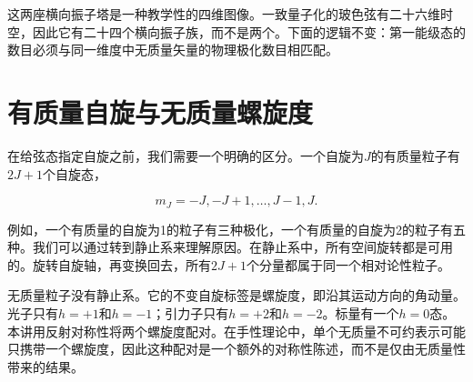 \begin{classroomqa}
\end{classroomqa}

\begin{classroomqa}
\end{classroomqa}

这两座横向振子塔是一种教学性的四维图像。一致量子化的玻色弦有二十六维时空，因此它有二十四个横向振子族，而不是两个。下面的逻辑不变：第一能级态的数目必须与同一维度中无质量矢量的物理极化数目相匹配。

\section{有质量自旋与无质量螺旋度}

在给弦态指定自旋之前，我们需要一个明确的区分。一个自旋为\(J\)的有质量粒子有\(2J+1\)个自旋态，

\begin{equation}
  m_J=-J,-J+1,\ldots,J-1,J.
  \label{eq:l03-massive-spin-multiplet}
\end{equation}

例如，一个有质量的自旋为1的粒子有三种极化，一个有质量的自旋为2的粒子有五种。我们可以通过转到静止系来理解原因。在静止系中，所有空间旋转都是可用的。旋转自旋轴，再变换回去，所有\(2J+1\)个分量都属于同一个相对论性粒子。

无质量粒子没有静止系。它的不变自旋标签是螺旋度，即沿其运动方向的角动量。光子只有\(h=+1\)和\(h=-1\)；引力子只有\(h=+2\)和\(h=-2\)。标量有一个\(h=0\)态。本讲用反射对称性将两个螺旋度配对。在手性理论中，单个无质量不可约表示可能只携带一个螺旋度，因此这种配对是一个额外的对称性陈述，而不是仅由无质量性带来的结果。

